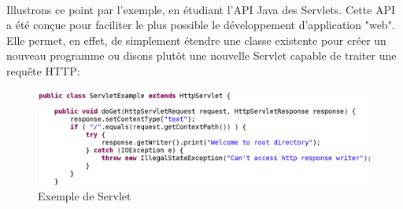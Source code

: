 {  \paragraph{} Illustrons ce point par l'exemple, en étudiant l'API Java des Servlets. Cette API a
  été conçue pour faciliter le plus possible le développement d'application "web". Elle permet, en
  effet, de simplement étendre une classe existente pour créer un nouveau programme ou disons
  plutôt une nouvelle Servlet capable de traiter une requête HTTP:

  \begin{figure}[hb]
    \begin{center}
      \includegraphics[scale=0.25]{img/servlet-api-tour.png}
      \caption{Exemple de Servlet}
      \label{servlet-demo}
    \end{center}
  \end{figure}
}


